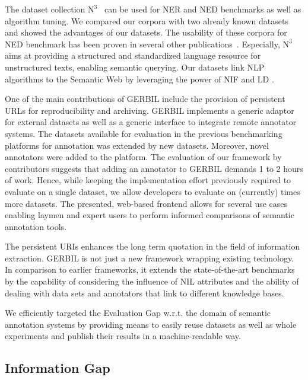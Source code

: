 The dataset collection $\mbox{N}^3$~\cite{n3} can be used for \ac{NER}  and \ac{NED}  benchmarks as well as algorithm tuning.
We compared our corpora with two already known datasets and showed the advantages of our datasets.
The usability of these corpora for \ac{NED}  benchmark has been proven in several other publications~\cite{agdistis_iswc,GER+13,GERBIL}.
Especially, $\mbox{N}^3$ aims at providing a structured and standardized language resource for unstructured texts, enabling semantic querying.
Our datasets link \ac{NLP}  algorithms to the Semantic Web by leveraging the power of NIF and \ac{LD} .

One of the main contributions of GERBIL include the provision of persistent URLs for reproducibility and archiving.
GERBIL implements a generic adaptor for external datasets as well as a generic interface to integrate remote annotator systems.
The datasets available for evaluation in the previous benchmarking platforms for annotation was extended by \numberOfadditionalDatasets new datasets. 
Moreover, \numberOfadditionalAnnotators novel annotators were added to the platform. 
The evaluation of our framework by contributors suggests that adding an annotator to GERBIL demands 1 to 2 hours of work. 
Hence, while keeping the implementation effort previously required to evaluate on a single dataset, we allow developers to evaluate on (currently) \overalldatasets times more datasets.
The presented, web-based frontend allows for several use cases enabling laymen and expert users to perform informed  comparisons of semantic annotation tools.

The persistent URIs enhances the long term quotation in the field of information extraction.
GERBIL is not just a new framework wrapping existing technology. 
In comparison to earlier frameworks, it extends the state-of-the-art benchmarks by the capability of considering the influence of NIL attributes and the ability of dealing with data sets and annotators that link to different knowledge bases.

We efficiently targeted the Evaluation Gap w.r.t. the domain of semantic annotation systems by providing means to easily reuse datasets as well as whole experiments and publish their results in a machine-readable way.

\subsection*{Information Gap}

